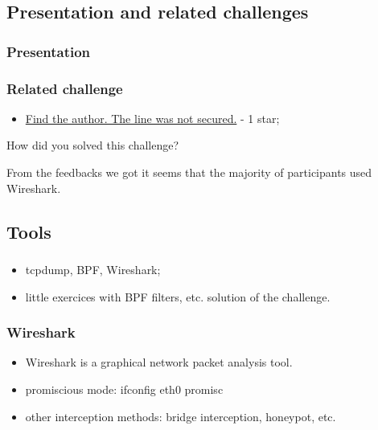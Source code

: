 \documentclass[]{beamer}
\begin{document}
\subsection{Presentation and related challenges}
\begin{frame}
\frametitle{Presentation}
\framesubtitle{}

\end{frame}


\begin{frame}
\frametitle{Related challenge}
\begin{itemize}
    \item \href{https://github.com/cscluxembourg/vestatech/blob/master/challenges/find-the-author/gift.cap}{Find the author. The line was not secured.} - 1 star;
\end{itemize}
\bigskip
How did you solved this challenge?

\bigskip
From the feedbacks we got it seems that the majority of participants used Wireshark.
\end{frame}




\subsection{Tools}
\begin{frame}
\frametitle{}
\begin{itemize}
\item tcpdump, BPF, Wireshark;
\item little exercices with BPF filters, etc. solution of the challenge.
\end{itemize}
\end{frame}

\begin{frame}
\frametitle{Wireshark}
\begin{itemize}
    \item Wireshark is a graphical network packet analysis tool.
    \item promiscious mode: ifconfig eth0 promisc
    \item other interception methods: bridge interception, honeypot, etc.
\end{itemize}
\end{frame}
\end{document}
